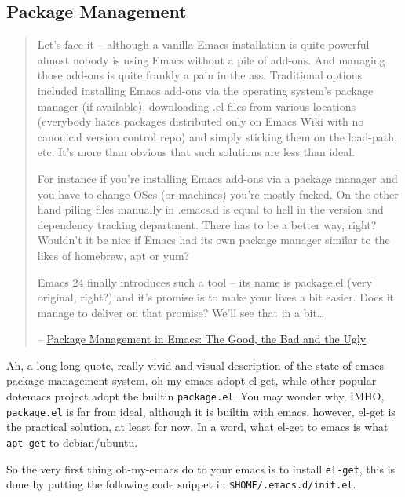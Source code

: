 \documentclass[11pt]{article}
\begin{document}
\subsection*{Package Management}
\label{sec-2-3}
\begin{quote}
Let's face it -- although a vanilla Emacs installation is quite powerful almost
nobody is using Emacs without a pile of add-ons. And managing those add-ons is
quite frankly a pain in the ass. Traditional options included installing Emacs
add-ons via the operating system's package manager (if available), downloading
.el files from various locations (everybody hates packages distributed only on
Emacs Wiki with no canonical version control repo) and simply sticking them on
the load-path, etc. It's more than obvious that such solutions are less than
ideal.

For instance if you're installing Emacs add-ons via a package manager and you
have to change OSes (or machines) you're mostly fucked. On the other hand
piling files manually in .emacs.d is equal to hell in the version and
dependency tracking department. There has to be a better way, right? Wouldn't
it be nice if Emacs had its own package manager similar to the likes of
homebrew, apt or yum?

Emacs 24 finally introduces such a tool -- its name is package.el (very
original, right?) and it's promise is to make your lives a bit easier. Does it
manage to deliver on that promise? We'll see that in a bit\ldots{}

-- \href{http://batsov.com/articles/2012/02/19/package-management-in-emacs-the-good-the-bad-and-the-ugly/}{Package Management in Emacs: The Good, the Bad and the Ugly}
\end{quote}

Ah, a long long quote, really vivid and visual description of the state of
emacs package management system. \href{https://github.com/xiaohanyu/oh-my-emacs}{oh-my-emacs} adopt \href{https://github.com/dimitri/el-get}{el-get}, while other popular
dotemacs project adopt the builtin \texttt{package.el}. You may wonder why, IMHO,
\texttt{package.el} is far from ideal, although it is builtin with emacs, however,
el-get is the practical solution, at least for now. In a word, what el-get
to emacs is what \texttt{apt-get} to debian/ubuntu.

So the very first thing oh-my-emacs do to your emacs is to install \texttt{el-get},
this is done by putting the following code snippet in \texttt{\$HOME/.emacs.d/init.el}.
\end{document}
